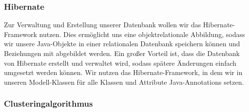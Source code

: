 	\subsubsection{Hibernate}
	Zur Verwaltung und Erstellung unserer Datenbank wollen wir das Hibernate-Framework nutzen. 
	Dies ermöglicht uns eine objektrelationale Abbildung, sodass wir unsere Java-Objekte in einer relationalen Datenbank speichern können und Beziehungen mit abgebildet werden.
	Ein großer Vorteil ist, dass die Datenbank von Hibernate erstellt und verwaltet wird, sodass spätere Änderungen einfach umgesetzt werden können.
	Wir nutzen das Hibernate-Framework, in dem wir in unseren Modell-Klassen für alle Klassen und Attribute Java-Annotations setzen.
	

	\subsubsection{Clusteringalgorithmus}

